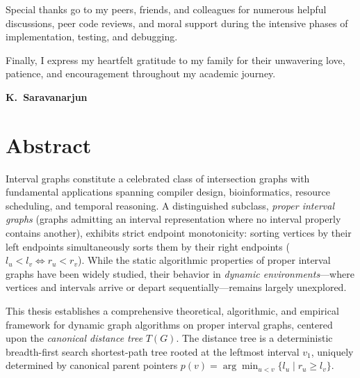 Special thanks go to my peers, friends, and colleagues for numerous helpful discussions, peer code reviews, and moral support during the intensive phases of implementation, testing, and debugging.

Finally, I express my heartfelt gratitude to my family for their unwavering love, patience, and encouragement throughout my academic journey.

\vspace{1.5cm}

\noindent
\textbf{K.\ Saravanarjun}

\clearpage


\chapter*{Abstract}

Interval graphs constitute a celebrated class of intersection graphs with fundamental applications spanning compiler design, bioinformatics, resource scheduling, and temporal reasoning. A distinguished subclass, \emph{proper interval graphs} (graphs admitting an interval representation where no interval properly contains another), exhibits strict endpoint monotonicity: sorting vertices by their left endpoints simultaneously sorts them by their right endpoints ($l_u < l_v \iff r_u < r_v$). While the static algorithmic properties of proper interval graphs have been widely studied, their behavior in \emph{dynamic environments}---where vertices and intervals arrive or depart sequentially---remains largely unexplored.

This thesis establishes a comprehensive theoretical, algorithmic, and empirical framework for dynamic graph algorithms on proper interval graphs, centered upon the \emph{canonical distance tree} $T(G)$. The distance tree is a deterministic breadth-first search shortest-path tree rooted at the leftmost interval $v_1$, uniquely determined by canonical parent pointers $p(v) = \arg\min_{u < v} \{ l_u \mid r_u \ge l_v \}$.

